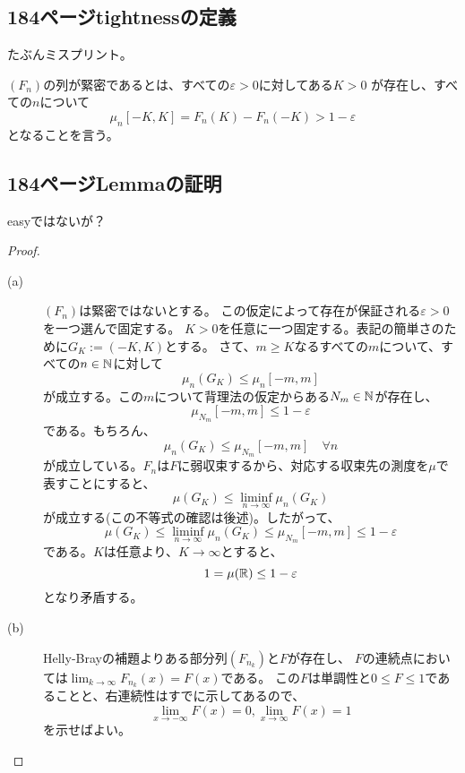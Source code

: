   \subsection{184ページtightnessの定義}
    たぶんミスプリント。
    \begin{def*}
      $(F_n)$の列が緊密であるとは、すべての$\varepsilon > 0$に対してある$K > 0$
      が存在し、すべての$n$について
      \[
        \mu_n[-K, K] = F_n(K) - F_n(-K) > 1 - \varepsilon
      \]
      となることを言う。
    \end{def*}

  \subsection{184ページLemmaの証明}
    easyではないが？
    \begin{proof}
      \begin{description}
        \item[(a)] $(F_n)$は緊密ではないとする。
        この仮定によって存在が保証される$\varepsilon > 0$を一つ選んで固定する。
        $K > 0$を任意に一つ固定する。表記の簡単さのために$G_K := (-K, K)$とする。
        さて、$m \ge K$なるすべての$m$について、すべての$n \in {\mathbb{N}}$に対して
        \[
          \mu_n(G_K) \leq \mu_n[-m,m]
        \]
        が成立する。この$m$について背理法の仮定からある$N_m \in {\mathbb{N}}$が存在し、
        \[
          \mu_{N_m}[-m,m] \leq 1 - \varepsilon
        \]
        である。もちろん、
        \[
          \mu_n (G_K) \leq \mu_{N_m}[-m,m] \quad \forall n
        \]
        が成立している。$F_n$は$F$に弱収束するから、対応する収束先の測度を$\mu$で表すことにすると、
        \[
          \mu(G_K) \leq \liminf_{n \to \infty}\mu_n(G_K)
        \]
        が成立する(この不等式の確認は後述)。したがって、
        \[
          \mu(G_K) \leq \liminf_{n \to \infty}\mu_n(G_K) \leq \mu_{N_m}[-m,m] \leq 1 - \varepsilon
        \]
        である。$K$は任意より、$K \longrightarrow \infty$とすると、
        \[
          1 = \mu({\mathbb{R}}) \leq 1 - \varepsilon
        \]
        となり矛盾する。
        \item[(b)] Helly-Brayの補題よりある部分列$(F_{n_k})$と$F$が存在し、
        $F$の連続点においては$\lim_{k \to \infty}F_{n_k}(x) = F(x)$である。
        この$F$は単調性と$0\leq F \leq 1$であることと、右連続性はすでに示してあるので、
        \[
          \lim_{x \to - \infty}F(x) = 0, \lim_{x \to \infty}F(x) = 1
        \]
        を示せばよい。


\end{description}
\end{proof}
